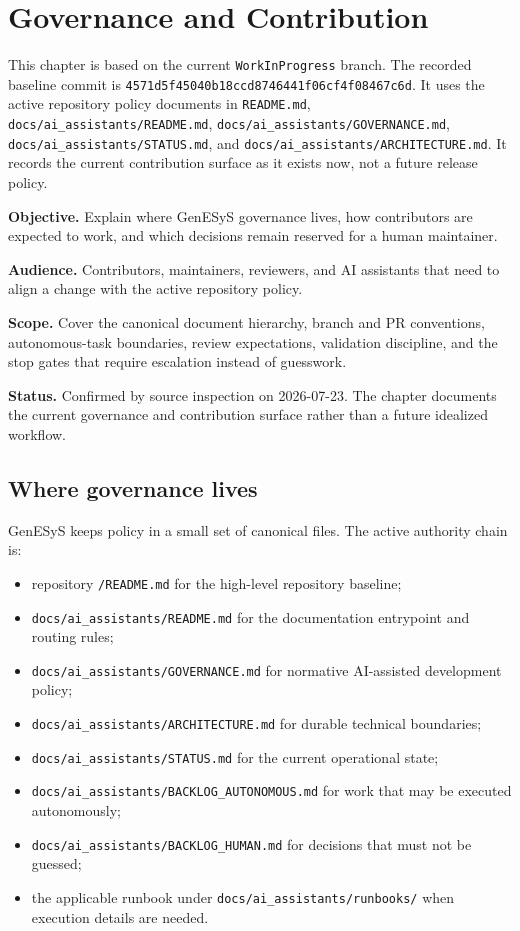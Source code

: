 \chapter{Governance and Contribution}
\label{chap:governance-and-contribution}

This chapter is based on the current \texttt{WorkInProgress} branch.
The recorded baseline commit is \texttt{4571d5f45040b18ccd8746441f06cf4f08467c6d}.
It uses the active repository policy documents in
\texttt{README.md}, \texttt{docs/ai\_assistants/README.md},
\texttt{docs/ai\_assistants/GOVERNANCE.md},
\texttt{docs/ai\_assistants/STATUS.md}, and
\texttt{docs/ai\_assistants/ARCHITECTURE.md}.
It records the current contribution surface as it exists now, not a future
release policy.

\noindent\textbf{Objective.} Explain where GenESyS governance lives, how
contributors are expected to work, and which decisions remain reserved for a
human maintainer.

\noindent\textbf{Audience.} Contributors, maintainers, reviewers, and AI
assistants that need to align a change with the active repository policy.

\noindent\textbf{Scope.} Cover the canonical document hierarchy, branch and PR
conventions, autonomous-task boundaries, review expectations, validation
discipline, and the stop gates that require escalation instead of guesswork.

\noindent\textbf{Status.} Confirmed by source inspection on 2026-07-23. The
chapter documents the current governance and contribution surface rather than a
future idealized workflow.

\section{Where governance lives}
\label{sec:governance-where-it-lives}

GenESyS keeps policy in a small set of canonical files. The active authority
chain is:
\begin{itemize}
\item repository \texttt{/README.md} for the high-level repository baseline;
\item \texttt{docs/ai\_assistants/README.md} for the documentation entrypoint
  and routing rules;
\item \texttt{docs/ai\_assistants/GOVERNANCE.md} for normative AI-assisted
  development policy;
\item \texttt{docs/ai\_assistants/ARCHITECTURE.md} for durable technical
  boundaries;
\item \texttt{docs/ai\_assistants/STATUS.md} for the current operational state;
\item \texttt{docs/ai\_assistants/BACKLOG\_AUTONOMOUS.md} for work that may be
  executed autonomously;
\item \texttt{docs/ai\_assistants/BACKLOG\_HUMAN.md} for decisions that must
  not be guessed;
\item the applicable runbook under \texttt{docs/ai\_assistants/runbooks/}
  when execution details are needed.
\end{itemize}

